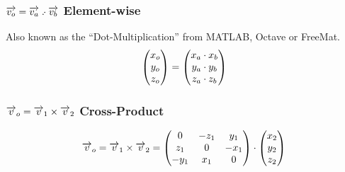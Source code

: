 \subsubsection*{$\overrightarrow{v_o} = \overrightarrow{v_a} \;. \! \!\cdot \overrightarrow{v_b} $ Element-wise}
Also known as the ``Dot-Multiplication'' from MATLAB, Octave or FreeMat.
\begin{equation}
	\begin{pmatrix}x_o\\y_o\\z_o\end{pmatrix} = 
	\begin{pmatrix}x_a \cdot x_b\\y_a \cdot y_b\\z_a \cdot z_b\end{pmatrix}
\end{equation}

\subsubsection*{$\overrightarrow{v}_o = \overrightarrow{v}_1 \times \overrightarrow{v}_2$ Cross-Product}
\begin{equation}
\overrightarrow{v}_o = \overrightarrow{v}_1 \times \overrightarrow{v}_2 = \begin{pmatrix}
 0   & -z_1 &  y_1 \\
 z_1 &  0   & -x_1 \\
-y_1 &  x_1 &  0
\end{pmatrix} \cdot \begin{pmatrix}x_2\\y_2\\z_2\end{pmatrix}
\end{equation}

